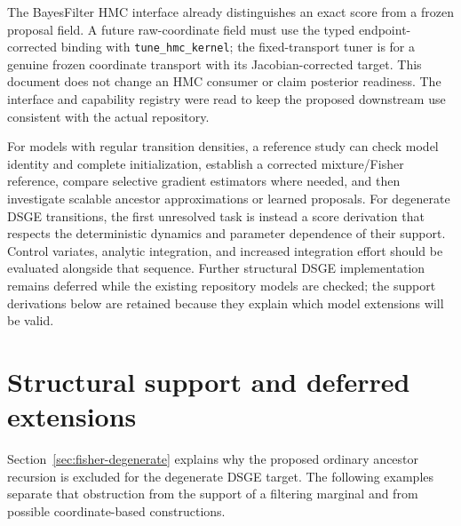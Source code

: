 \documentclass[11pt]{article}
\begin{document}
The BayesFilter HMC interface already distinguishes an exact score from a
frozen proposal field. A future raw-coordinate field must use the typed
endpoint-corrected binding with \texttt{tune\_hmc\_kernel}; the
fixed-transport tuner is for a genuine frozen coordinate transport with its
Jacobian-corrected target. This document does not change an HMC consumer or
claim posterior readiness. The interface and capability registry were read
to keep the proposed downstream use consistent with the actual repository.

For models with regular transition densities, a reference study can check
model identity and complete initialization, establish a corrected
mixture/Fisher reference, compare selective gradient estimators where needed,
and then investigate scalable ancestor approximations or learned proposals.
For degenerate DSGE transitions, the first unresolved task is instead a
score derivation that respects the deterministic dynamics and parameter
dependence of their support. Control variates, analytic
integration, and increased integration effort should be evaluated alongside
that sequence. Further structural DSGE implementation remains deferred while
the existing repository models are checked; the support derivations below
are retained because they explain which model extensions will be valid.


\section{Structural support and deferred extensions}
\label{sec:support}

Section~\ref{sec:fisher-degenerate} explains why the proposed ordinary
ancestor recursion is excluded for the degenerate DSGE target. The following
examples separate that obstruction from the support of a filtering marginal
and from possible coordinate-based constructions.
\end{document}
